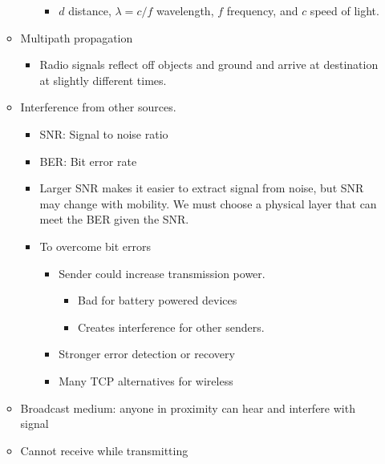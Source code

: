 \begin{itemize}
\begin{itemize}
\begin{itemize}
      \begin{itemize}
      \tightlist
      \item
        \(d\) distance, \(\lambda = c/f\) wavelength, \(f\) frequency,
        and \(c\) speed of light.
      \end{itemize}
    \end{itemize}
  \item
    Multipath propagation

    \begin{itemize}
    \tightlist
    \item
      Radio signals reflect off objects and ground and arrive at
      destination at slightly different times.
    \end{itemize}
  \item
    Interference from other sources.

    \begin{itemize}
    \tightlist
    \item
      SNR: Signal to noise ratio
    \item
      BER: Bit error rate
    \item
      Larger SNR makes it easier to extract signal from noise, but SNR
      may change with mobility. We must choose a physical layer that can
      meet the BER given the SNR.
    \item
      To overcome bit errors

      \begin{itemize}
      \tightlist
      \item
        Sender could increase transmission power.

        \begin{itemize}
        \tightlist
        \item
          Bad for battery powered devices
        \item
          Creates interference for other senders.\\
        \end{itemize}
      \item
        Stronger error detection or recovery
      \item
        Many TCP alternatives for wireless
      \end{itemize}
    \end{itemize}
  \item
    Broadcast medium: anyone in proximity can hear and interfere with
    signal
  \item
    Cannot receive while transmitting


\end{itemize}
\end{itemize}
